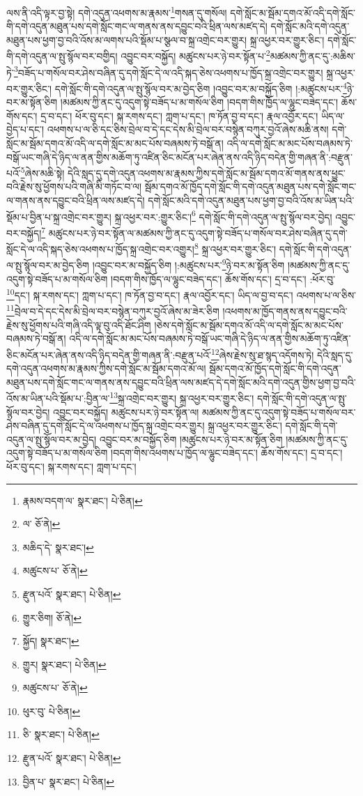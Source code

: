 ལས་ནི་འདི་ལྟར་བྱ་སྟེ། དགེ་འདུན་འཕགས་མ་རྣམས་\footnote{རྣམས་བདག་ལ་  སྣར་ཐང་།  པེ་ཅིན། }གསན་དུ་གསོལ། དགེ་སློང་མ་སྦོམ་དགའ་མོ་འདི་དགེ་སློང་གི་དགེ་འདུན་མཐུན་པས་དགེ་སློང་གང་ལ་གནས་ནས་དབྱུང་བའི་ཕྲིན་ལས་མཛད་དེ། དགེ་སློང་མའི་དགེ་འདུན་མཐུན་པས་ཕྱག་བྱ་བའི་འོས་མ་ལགས་པའི་སྡོམ་པ་སྩལ་བ་སྐྲ་འགྲེང་བར་གྱུར། སྐྲ་འཕྱར་བར་གྱུར་ཅིང་། དགེ་སློང་གི་དགེ་འདུན་ལ་སྤུ་སྙོལ་བར་བགྱིད། འབྱུང་བར་བསྐྱོད། མཚུངས་པར་ཉེ་བར་སྟོན་པ་\footnote{ལ་  ཅོ་ནེ། }མཚམས་ཀྱི་ནང་དུ་:མཆིས་ཏེ་\footnote{མཆིད་དེ་  སྣར་ཐང་། }བཟོད་པ་གསོལ་བར་ཤེས་བཞིན་དུ་དགེ་སློང་དེ་ལ་འདི་སྐད་ཅེས་འཕགས་པ་ཁྱོད་སྐྲ་འགྲེང་བར་གྱུར། སྐྲ་འཕྱར་བར་གྱུར་ཅིང་། དགེ་སློང་གི་དགེ་འདུན་ལ་སྤུ་སྙོལ་བར་མ་བྱེད་ཅིག །འབྱུང་བར་མ་བསྐྱོད་ཅིག །:མཚུངས་པར་\footnote{མཚུངས་པ་  ཅོ་ནེ། }ཉེ་བར་མ་སྟོན་ཅིག །མཚམས་ཀྱི་ནང་དུ་འདུག་སྟེ་བཟོད་པ་མ་གསོལ་ཅིག །བདག་གིས་ཁྱོད་ལ་ལྷུང་བཟེད་དང་། ཆོས་གོས་དང་། དྲ་བ་དང་། ཕོར་བུ་དང་། སྐ་རགས་དང་། ཀླག་པ་དང་། ཁ་ཏོན་བྱ་བ་དང་། རྣལ་འབྱོར་དང་། ཡིད་ལ་བྱེད་པ་དང་། འཕགས་པ་ལ་ཅི་དང་ཅིས་བྲེལ་བ་དེ་དང་དེས་མི་བྲེལ་བར་བསྙེན་བཀུར་བྱའོ་ཞེས་མཆི་ནས། དགེ་སློང་མ་སྦོམ་དགའ་མོ་འདི་ལ་དགེ་སློང་མ་མང་པོས་བཞམས་ཏེ་བསྒོ་ན། འདི་ལ་དགེ་སློང་མ་མང་པོས་བཞམས་ཏེ་བསྒོ་ཡང་གཞི་དེ་ཉིད་ལ་ནན་གྱིས་མཆོག་ཏུ་འཛིན་ཅིང་མངོན་པར་ཞེན་ནས་འདི་ཉིད་བདེན་གྱི་གཞན་ནི་:བརྫུན་པའོ་\footnote{རྫུན་པའོ་  སྣར་ཐང་།  པེ་ཅིན། }ཞེས་མཆི་སྟེ། དེའི་སླད་དུ་དགེ་འདུན་འཕགས་མ་རྣམས་ཀྱིས་དགེ་སློང་མ་སྦོམ་དགའ་མོ་གནས་ནས་ཕྱུང་བའི་རྗེས་སུ་ཕྱོགས་པའི་གཞི་མི་གཏོང་བ་ལ། སྦོམ་དགའ་མོ་ཁྱོད་དགེ་སློང་གི་དགེ་འདུན་མཐུན་པས་དགེ་སློང་གང་ལ་གནས་ནས་དབྱུང་བའི་ཕྲིན་ལས་མཛད་དེ། དགེ་སློང་མའི་དགེ་འདུན་མཐུན་པས་ཕྱག་བྱ་བའི་འོས་མ་ཡིན་པའི་སྡོམ་པ་བྱིན་པ་སྐྲ་འགྲེང་བར་གྱུར། སྐྲ་འཕྱར་བར་:གྱུར་ཅིང་།\footnote{གྱུར་ཅིག།  ཅོ་ནེ། } དགེ་སློང་གི་དགེ་འདུན་ལ་སྤུ་སྙོལ་བར་བྱེད། འབྱུང་བར་བསྐྱོད།\footnote{སྐྱོད།  སྣར་ཐང་། } མཚུངས་པར་ཉེ་བར་སྟོན་ལ་མཚམས་ཀྱི་ནང་དུ་འདུག་སྟེ་བཟོད་པ་གསོལ་བར་ཤེས་བཞིན་དུ་དགེ་སློང་དེ་ལ་འདི་སྐད་ཅེས་འཕགས་པ་ཁྱོད་སྐྲ་འགྲེང་བར་འགྱུར།\footnote{གྱུར།  སྣར་ཐང་།  པེ་ཅིན། } སྐྲ་འཕྱར་བར་གྱུར་ཅིང་། དགེ་སློང་གི་དགེ་འདུན་ལ་སྤུ་སྙོལ་བར་མ་བྱེད་ཅིག །འབྱུང་བར་མ་བསྐྱོད་ཅིག །:མཚུངས་པར་\footnote{མཚུངས་པ་  ཅོ་ནེ། }ཉེ་བར་མ་སྟོན་ཅིག །མཚམས་ཀྱི་ནང་དུ་འདུག་སྟེ་བཟོད་པ་མ་གསོལ་ཅིག །བདག་གིས་ཁྱོད་ལ་ལྷུང་བཟེད་དང་། ཆོས་གོས་དང་། དྲ་བ་དང་། :ཕོར་བུ་\footnote{ཕུར་བུ་  པེ་ཅིན། }དང་། སྐ་རགས་དང་། ཀླག་པ་དང་། ཁ་ཏོན་བྱ་བ་དང་། རྣལ་འབྱོར་དང་། ཡིད་ལ་བྱ་བ་དང་། འཕགས་པ་ལ་ཅིས་\footnote{ཅི་  སྣར་ཐང་།  པེ་ཅིན། }བྲེལ་བ་དེ་དང་དེས་མི་བྲེལ་བར་བསྙེན་བཀུར་བྱའོ་ཞེས་མ་ཟེར་ཅིག །འཕགས་མ་ཁྱོད་གནས་ནས་དབྱུང་བའི་རྗེས་སུ་ཕྱོགས་པའི་གཞི་འདི་ལྟ་བུ་འདི་ཐོང་ཤིག །ཅེས་དགེ་སློང་མ་སྦོམ་དགའ་མོ་འདི་ལ་དགེ་སློང་མ་མང་པོས་བཞམས་ཏེ་བསྒོ་ན། འདི་ལ་དགེ་སློང་མ་མང་པོས་བཞམས་ཏེ་བསྒོ་ཡང་གཞི་དེ་ཉིད་ལ་ནན་གྱིས་མཆོག་ཏུ་འཛིན་ཅིང་མངོན་པར་ཞེན་ནས་འདི་ཉིད་བདེན་གྱི་གཞན་ནི་:བརྫུན་པའོ་\footnote{རྫུན་པའོ་  སྣར་ཐང་།  པེ་ཅིན། }ཞེས་རྗེས་སུ་ཐ་སྙད་འདོགས་ཏེ། དེའི་སླད་དུ་དགེ་འདུན་འཕགས་མ་རྣམས་ཀྱིས་དགེ་སློང་མ་སྦོམ་དགའ་མོ་ལ། སྦོམ་དགའ་མོ་ཁྱོད་དགེ་སློང་གི་དགེ་འདུན་མཐུན་པས་དགེ་སློང་གང་ལ་གནས་ནས་དབྱུང་བའི་ཕྲིན་ལས་མཛད་དེ་དགེ་སློང་མའི་དགེ་འདུན་གྱིས་ཕྱག་བྱ་བའི་འོས་མ་ཡིན་པའི་སྡོམ་པ་:བྱིན་ལ་\footnote{བྱིན་པ་  སྣར་ཐང་།  པེ་ཅིན། }སྐྲ་འགྲེང་བར་གྱུར། སྐྲ་འཕྱར་བར་གྱུར་ཅིང་། དགེ་སློང་གི་དགེ་འདུན་ལ་སྤུ་སྙོལ་བར་བྱེད། འབྱུང་བར་བསྐྱོད། མཚུངས་པར་ཉེ་བར་སྟོན་ལ། མཚམས་ཀྱི་ནང་དུ་འདུག་སྟེ་བཟོད་པ་གསོལ་བར་ཤེས་བཞིན་དུ་དགེ་སློང་དེ་ལ་འཕགས་པ་ཁྱོད་སྐྲ་འགྲེང་བར་གྱུར། སྐྲ་འཕྱར་བར་གྱུར་ཅིང་། དགེ་སློང་གི་དགེ་འདུན་ལ་སྤུ་སྙོལ་བར་མ་བྱེད། འབྱུང་བར་མ་བསྐྱོད་ཅིག །མཚུངས་པར་ཉེ་བར་མ་སྟོན་ཅིག །མཚམས་ཀྱི་ནང་དུ་འདུག་སྟེ་བཟོད་པ་མ་གསོལ་ཅིག །བདག་གིས་འཕགས་པ་ཁྱོད་ལ་ལྷུང་བཟེད་དང་། ཆོས་གོས་དང་། དྲ་བ་དང་། ཕོར་བུ་དང་། སྐ་རགས་དང་། ཀླག་པ་དང་། 